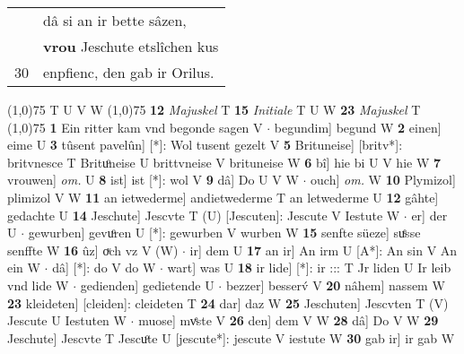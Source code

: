 \documentclass[8pt,a4paper,notitlepage]{article}
\begin{document}
\begin{table}[ht]
\begin{minipage}[t]{0.5\linewidth}
\begin{tabular}{rl}
 & dâ si an ir bette sâzen,\\ 
 & \textbf{vrou} Jeschute etslîchen kus\\ 
30 & enpfienc, den gab ir Orilus.\\ 
\end{tabular}
\scriptsize
\line(1,0){75} \newline
T U V W \newline
\line(1,0){75} \newline
\textbf{12} \textit{Majuskel} T  \textbf{15} \textit{Initiale} T U W  \textbf{23} \textit{Majuskel} T  \newline
\line(1,0){75} \newline
\textbf{1} Ein ritter kam vnd begonde sagen V  $\cdot$ begundim] begund W \textbf{2} einen] eime U \textbf{3} tûsent pavelûn] [*]: Wol tusent gezelt V \textbf{5} Brituneise] [britv*]: britvnesce T Brituͦneise U brittvneise V brituneise W \textbf{6} bî] hie bi U V hie W \textbf{7} vrouwen] \textit{om.} U \textbf{8} ist] ist [*]: wol V \textbf{9} dâ] Do U V W  $\cdot$ ouch] \textit{om.} W \textbf{10} Plymizol] plimizol V W \textbf{11} an ietwederme] andietwederme T an letwederme U \textbf{12} gâhte] gedachte U \textbf{14} Jeschute] Jescvte T (U) [Jescuten]: Jescute  V Iestute W  $\cdot$ er] der U  $\cdot$ gewurben] gevuͦren U [*]: gewurben V wurben W \textbf{15} senfte süeze] suͤsse senffte W \textbf{16} ûz] oͮch vz V (W)  $\cdot$ ir] dem U \textbf{17} an ir] An irm U [A*]: An sin V An ein W  $\cdot$ dâ] [*]: do V do W  $\cdot$ wart] was U \textbf{18} ir lide] [*]: ir ::: T Jr liden U Ir leib vnd lide W  $\cdot$ gedienden] gedietende U  $\cdot$ bezzer] besserv́ V \textbf{20} nâhem] nassem W \textbf{23} kleideten] [cleiden]: cleideten T \textbf{24} dar] daz W \textbf{25} Jeschuten] Jescvten T (V) Jescute U Iestuten W  $\cdot$ muose] mvͤste V \textbf{26} den] dem V W \textbf{28} dâ] Do V W \textbf{29} Jeschute] Jescvte T Jescuͦte U [jescute*]: jescute V iestute W \textbf{30} gab ir] ir gab W \newline
\end{minipage}
\end{table}
\end{document}

